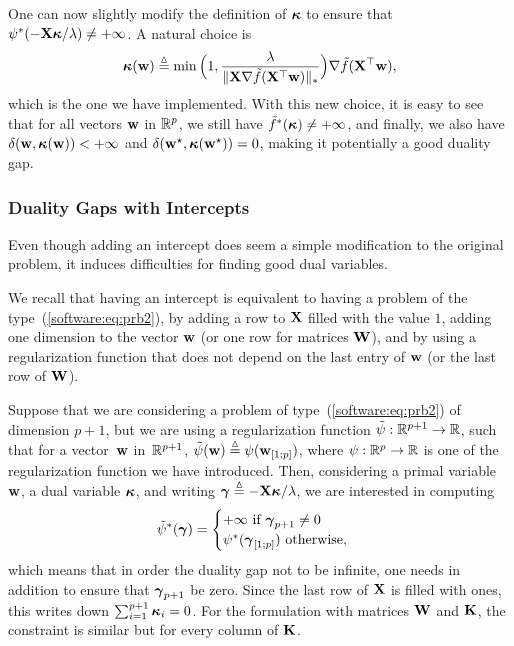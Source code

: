 \documentclass[a4paper, 11pt]{article}
\begin{document}
   One can now slightly modify the definition of ${\boldsymbol\kappa}$
   to ensure that $\psi^\ast(-{\mathbf X}{\boldsymbol\kappa}/\lambda) \neq
   +\infty$. A natural choice is
   \begin{displaymath}
   {\boldsymbol\kappa}({\mathbf w}) \stackrel{\vartriangle}{=}
   \min\Big(1,\frac{\lambda}{\|{\mathbf X}\nabla\tilde{f}({\mathbf X}^\top{\mathbf w})\|_\ast}\Big)\nabla
   \tilde{f}({\mathbf X}^\top{\mathbf w}), 
   \end{displaymath}
   which is the one we have implemented.  With this new choice, it is easy to see
   that for all vectors ${\mathbf w}$ in ${\mathbb R}^p$, we still have $\tilde{f}^\ast({\boldsymbol\kappa}) \neq + \infty$, and
   finally, we also have $\delta({\mathbf w},{\boldsymbol\kappa}({\mathbf w})) < + \infty$ and
   $\delta({\mathbf w}^\star,{\boldsymbol\kappa}({\mathbf w}^\star))=0$, making it potentially a good
   duality gap.

   \subsubsection{Duality Gaps with Intercepts}
   Even though adding an intercept does seem a simple modification to the original
   problem, it induces difficulties for finding good dual variables.

   We recall that having an intercept is equivalent to having a problem of the
   type~(\ref{software:eq:prb2}), by adding a row to ${\mathbf X}$ filled with the value
   $1$, adding one dimension to the vector ${\mathbf w}$ (or one row for matrices ${\mathbf W}$),
   and by using a regularization function that does not depend on the last entry
   of ${\mathbf w}$ (or the last row of ${\mathbf W}$).

   Suppose that we are considering a problem of
   type~(\ref{software:eq:prb2}) of dimension $p+1$, but we are using a
   regularization function $\tilde{\psi}: {\mathbb R}^{p+1} \to {\mathbb R}$, such that for a
   vector~${\mathbf w}$ in~${\mathbb R}^{p+1}$, $\tilde{\psi}({\mathbf w}) \stackrel{\vartriangle}{=} \psi({\mathbf w}_{[ 1;p ]})$,
   where $\psi: {\mathbb R}^p \to {\mathbb R}$ is one of the regularization function we have
   introduced. Then, considering a primal variable ${\mathbf w}$, a dual variable ${\boldsymbol\kappa}$, 
   and writing ${\boldsymbol\gamma}\stackrel{\vartriangle}{=}-{\mathbf X}{\boldsymbol\kappa}/\lambda$, we are interested in computing
   \begin{displaymath}
   \tilde{\psi}^\ast({\boldsymbol\gamma}) = \begin{cases}
   +\infty ~\text{if}~ {\boldsymbol\gamma}_{p+1} \neq 0 \\
      \psi^\ast({\boldsymbol\gamma}_{[ 1;p ]}) ~\text{otherwise},
   \end{cases}
   \end{displaymath}
   which means that in order the duality gap not to be infinite, one needs in addition to ensure
   that ${\boldsymbol\gamma}_{p+1}$ be zero. Since the last row of ${\mathbf X}$ is filled with ones, this writes
   down $\sum_{i=1}^{p+1} {\boldsymbol\kappa}_{i}=0$.
   For the formulation with matrices ${\mathbf W}$ and ${\mathbf K}$, the constraint is similar but for every
   column of ${\mathbf K}$.
\end{document}
